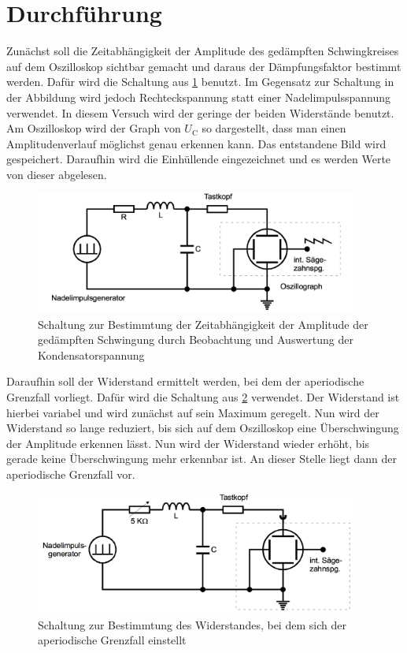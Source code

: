 \section{Durchführung}
\label{sec:Durchführung}
Zunächst soll die Zeitabhängigkeit der Amplitude des gedämpften Schwingkreises auf
dem Oszilloskop sichtbar gemacht und daraus der Dämpfungsfaktor bestimmt werden.
Dafür wird die Schaltung aus \ref{fig:aufbau_1} benutzt. Im Gegensatz zur Schaltung in der Abbildung
wird jedoch Rechteckspannung statt einer Nadelimpulsspannung verwendet. In diesem
Versuch wird der geringe der beiden Widerstände benutzt. Am Oszilloskop wird der Graph
von $U_{\text{C}}$ so dargestellt, dass man einen Amplitudenverlauf möglichst genau erkennen kann.
Das entstandene Bild wird gespeichert. Daraufhin wird die Einhüllende eingezeichnet
und es werden Werte von dieser abgelesen.
\begin{figure}
  \centering
  \includegraphics[width=300pt]{data/aufbau_1.png}
  \caption{Schaltung zur Bestimmtung der Zeitabhängigkeit der Amplitude der gedämpften
  Schwingung durch Beobachtung und Auswertung der Kondensatorspannung \cite{Versuchsanleitung1}}
  \label{fig:aufbau_1}
\end{figure}


Daraufhin soll der Widerstand ermittelt werden, bei dem der aperiodische Grenzfall
vorliegt. Dafür wird die Schaltung aus \ref{fig:aufbau_2} verwendet. Der Widerstand ist hierbei variabel
und wird zunächst auf sein Maximum geregelt. Nun wird der Widerstand so lange reduziert,
bis sich auf dem Oszilloskop eine Überschwingung der Amplitude erkennen lässt. Nun wird
der Widerstand wieder erhöht, bis gerade keine Überschwingung mehr erkennbar ist. An
dieser Stelle liegt dann der aperiodische Grenzfall vor.
\begin{figure}
  \centering
  \includegraphics[width=300pt]{data/aufbau_2.png}
  \caption{Schaltung zur Bestimmtung des Widerstandes, bei dem sich der aperiodische
  Grenzfall einstellt \cite{Versuchsanleitung1}}
  \label{fig:aufbau_2}
\end{figure}



